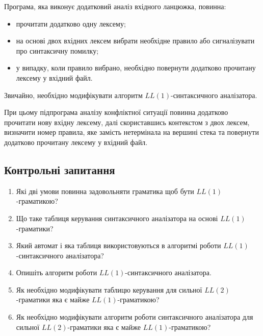 Програма, яка виконує додатковий аналіз вхідного ланцюжка, повинна:
\begin{itemize}
	\item прочитати додатково одну лексему;
	\item на основі двох вхідних лексем вибрати необхідне правило або сигналізувати про синтаксичну помилку;
	\item у випадку, коли правило вибрано, необхідно повернути додатково прочитану лексему у вхідний файл.
\end{itemize}

Звичайно, необхідно модифікувати алгоритм $LL(1)$-синтаксичного аналізатора. \medskip

При цьому підпрограма аналізу конфліктної ситуації повинна додатково прочитати нову вхідну лексему, далі скориставшись контекстом з двох лексем, визначити номер правила, яке замість нетермінала на вершині стека та повернути додатково прочитану лексему у вхідний файл.

\subsection{Контрольні запитання}

\begin{enumerate}
	\item Які дві умови повинна задовольняти граматика щоб бути $LL(1)$-граматикою?
	\item Що таке таблиця керування синтаксичного аналізатора на основі $LL(1)$-граматики?
	\item Який автомат і яка таблиця використовуються в алгоритмі роботи $LL(1)$-синтаксичного аналізатора? %
	\item Опишіть алгоритм роботи $LL(1)$-синтаксичного аналізатора.
	\item Як необхідно модифікувати таблицю керування для сильної $LL(2)$-граматики яка є майже $LL(1)$-граматикою?
	\item Як необхідно модифікувати алгоритм роботи синтаксичного аналізатора для сильної $LL(2)$-граматики яка є майже $LL(1)$-граматикою?
\end{enumerate}
